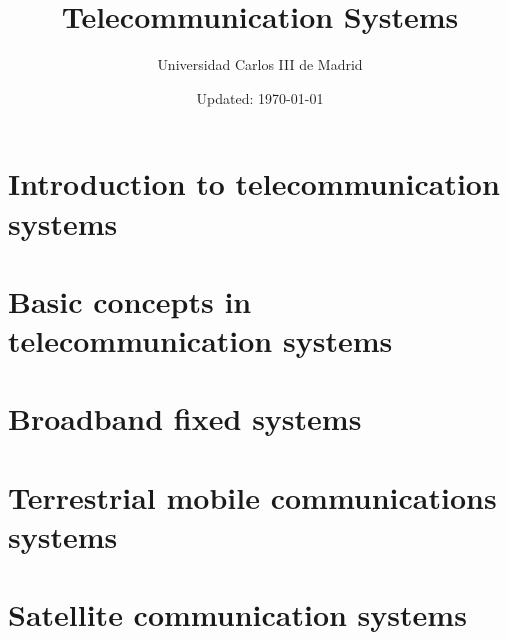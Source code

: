 \documentclass[
	12pt,
	twoside
]{book}
\title{Telecommunication Systems}
\author{Universidad Carlos III de Madrid}
\date{Updated: \today}
\begin{document}

\newpage

\tableofcontents

\chapter{Introduction to telecommunication systems}


\chapter{Basic concepts in telecommunication systems}


\chapter{Broadband fixed systems}


\chapter{Terrestrial mobile communications systems}


\chapter{Satellite communication systems}

\end{document}
